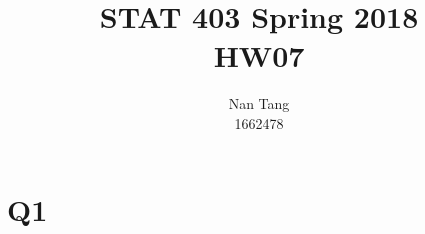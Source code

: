 \documentclass[12pt,letterpaper]{article}
\author{Nan Tang \\ 1662478}
\title{STAT 403 Spring 2018\\HW07}
\begin{document}
\maketitle

\section*{Q1}




\end{document}
